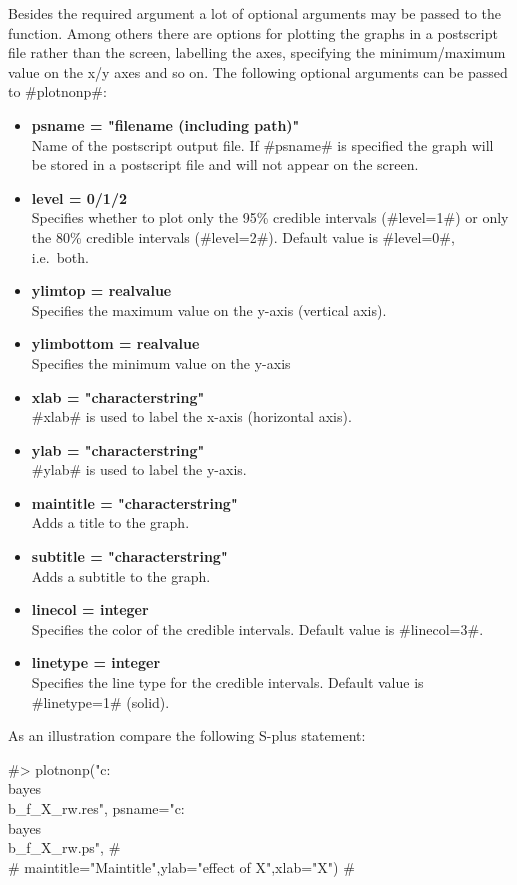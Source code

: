 Besides the required argument a lot of optional arguments may be
passed to the function. Among others there are options for
plotting the graphs in a postscript file rather than the screen,
labelling the axes, specifying the minimum/maximum value on the
x/y axes and so on. The following optional arguments can be passed
to #plotnonp#:

\begin{itemize}
\item {\bf psname = "filename (including path)"}\\
Name of the postscript output file. If #psname# is specified the
graph will be stored in a postscript file and will not appear on
the screen.
\item {\bf level = 0/1/2} \\
Specifies whether to plot only the 95\% credible intervals
(#level=1#) or only the 80\% credible intervals (#level=2#).
Default value is #level=0#, i.e.~both.
\item {\bf ylimtop = realvalue} \\
Specifies the maximum value on the y-axis (vertical axis).
\item {\bf ylimbottom = realvalue}\\
Specifies the minimum value on the y-axis
\item {\bf xlab = "characterstring"} \\
#xlab# is used to label the x-axis (horizontal axis).
\item {\bf ylab = "characterstring"} \\
#ylab# is used to label the y-axis.
\item {\bf maintitle = "characterstring"} \\
Adds a title to the graph.
\item {\bf subtitle = "characterstring"} \\
Adds a subtitle to the graph.
\item {\bf linecol = integer} \\
Specifies the color of the credible intervals. Default value is
#linecol=3#.
\item {\bf linetype = integer} \\
Specifies the line type for the credible intervals. Default value
is #linetype=1# (solid).
\end{itemize}

As an illustration compare the following S-plus statement:

#> plotnonp("c:\\bayes\\b_f_X_rw.res", psname="c:\\bayes\\b_f_X_rw.ps", #\\
#  maintitle="Maintitle",ylab="effect of X",xlab="X") #

